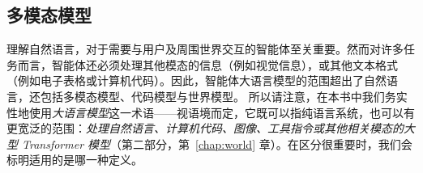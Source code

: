 
\subsection{多模态模型}
理解自然语言，对于需要与用户及周围世界交互的智能体至关重要。然而对许多任务而言，智能体还必须处理其他模态的信息（例如视觉信息），或其他文本格式（例如电子表格或计算机代码）。因此，智能体大语言模型的范围超出了自然语言，还包括多模态模型、代码模型与世界模型。
所以请注意，在本书中我们务实性地使用{\em 大语言模型}这一术语——视语境而定，它既可以指纯语言系统，也可以有更宽泛的范围：{\em 处理自然语言、计算机代码、图像、工具指令或其他相关模态的大型 Transformer 模型}（第二部分，第~\ref{chap:world} 章）。在区分很重要时，我们会标明适用的是哪一种定义。




